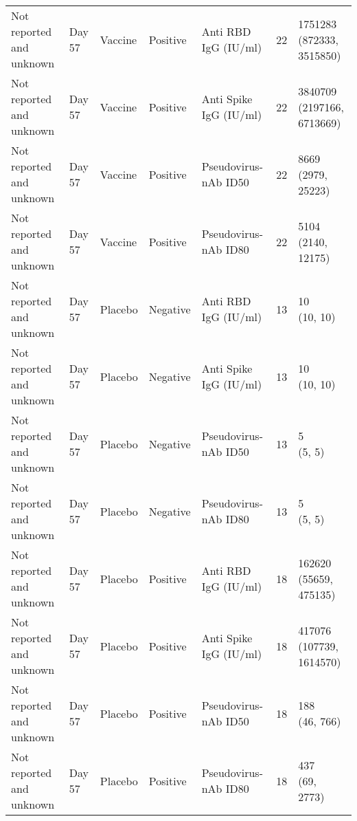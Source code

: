 \documentclass[]{book}
\theoremstyle{definition}
\theoremstyle{definition}
\theoremstyle{definition}
\newcommand{\1}{\mathbbm{1}}
\begin{document}
\begin{landscape}
\begin{ThreePartTable}
\begin{longtable}[t]{>{\raggedright\arraybackslash}p{7cm}llllll}
\hspace{1em}Not reported and unknown & Day 57 & Vaccine & Positive & Anti RBD IgG (IU/ml) & 22 & \makecell[l]{1751283\\(872333, 3515850)}\\
\hspace{1em}Not reported and unknown & Day 57 & Vaccine & Positive & Anti Spike IgG (IU/ml) & 22 & \makecell[l]{3840709\\(2197166, 6713669)}\\
\hspace{1em}Not reported and unknown & Day 57 & Vaccine & Positive & Pseudovirus-nAb ID50 & 22 & \makecell[l]{8669\\(2979, 25223)}\\
\hspace{1em}Not reported and unknown & Day 57 & Vaccine & Positive & Pseudovirus-nAb ID80 & 22 & \makecell[l]{5104\\(2140, 12175)}\\
\hspace{1em}Not reported and unknown & Day 57 & Placebo & Negative & Anti RBD IgG (IU/ml) & 13 & \makecell[l]{10\\(10, 10)}\\
\hspace{1em}Not reported and unknown & Day 57 & Placebo & Negative & Anti Spike IgG (IU/ml) & 13 & \makecell[l]{10\\(10, 10)}\\
\hspace{1em}Not reported and unknown & Day 57 & Placebo & Negative & Pseudovirus-nAb ID50 & 13 & \makecell[l]{5\\(5, 5)}\\
\hspace{1em}Not reported and unknown & Day 57 & Placebo & Negative & Pseudovirus-nAb ID80 & 13 & \makecell[l]{5\\(5, 5)}\\
\hspace{1em}Not reported and unknown & Day 57 & Placebo & Positive & Anti RBD IgG (IU/ml) & 18 & \makecell[l]{162620\\(55659, 475135)}\\
\hspace{1em}Not reported and unknown & Day 57 & Placebo & Positive & Anti Spike IgG (IU/ml) & 18 & \makecell[l]{417076\\(107739, 1614570)}\\
\hspace{1em}Not reported and unknown & Day 57 & Placebo & Positive & Pseudovirus-nAb ID50 & 18 & \makecell[l]{188\\(46, 766)}\\
\hspace{1em}Not reported and unknown & Day 57 & Placebo & Positive & Pseudovirus-nAb ID80 & 18 & \makecell[l]{437\\(69, 2773)}\\*
\end{longtable}
\end{ThreePartTable}



\end{landscape}
\end{document}
